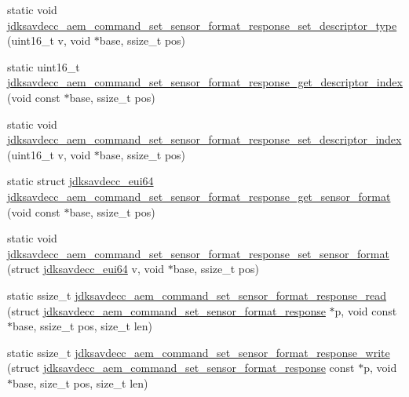 \begin{DoxyCompactItemize}
static void \hyperlink{group__command__set__sensor__format__response_gaa0feef7d1fa309ccdd3092096e2f42da}{jdksavdecc\+\_\+aem\+\_\+command\+\_\+set\+\_\+sensor\+\_\+format\+\_\+response\+\_\+set\+\_\+descriptor\+\_\+type} (uint16\+\_\+t v, void $\ast$base, ssize\+\_\+t pos)
\item 
static uint16\+\_\+t \hyperlink{group__command__set__sensor__format__response_ga404aefce22547a271cb35bf68dc91a01}{jdksavdecc\+\_\+aem\+\_\+command\+\_\+set\+\_\+sensor\+\_\+format\+\_\+response\+\_\+get\+\_\+descriptor\+\_\+index} (void const $\ast$base, ssize\+\_\+t pos)
\item 
static void \hyperlink{group__command__set__sensor__format__response_gabee4a1aaa2351e00b64bf96181ee99de}{jdksavdecc\+\_\+aem\+\_\+command\+\_\+set\+\_\+sensor\+\_\+format\+\_\+response\+\_\+set\+\_\+descriptor\+\_\+index} (uint16\+\_\+t v, void $\ast$base, ssize\+\_\+t pos)
\item 
static struct \hyperlink{structjdksavdecc__eui64}{jdksavdecc\+\_\+eui64} \hyperlink{group__command__set__sensor__format__response_gadcf1b270b1733ef7a7978c8feee30cff}{jdksavdecc\+\_\+aem\+\_\+command\+\_\+set\+\_\+sensor\+\_\+format\+\_\+response\+\_\+get\+\_\+sensor\+\_\+format} (void const $\ast$base, ssize\+\_\+t pos)
\item 
static void \hyperlink{group__command__set__sensor__format__response_ga1684e3afa658528483f2a966c5895e30}{jdksavdecc\+\_\+aem\+\_\+command\+\_\+set\+\_\+sensor\+\_\+format\+\_\+response\+\_\+set\+\_\+sensor\+\_\+format} (struct \hyperlink{structjdksavdecc__eui64}{jdksavdecc\+\_\+eui64} v, void $\ast$base, ssize\+\_\+t pos)
\item 
static ssize\+\_\+t \hyperlink{group__command__set__sensor__format__response_ga671f14942529f6fafe7dd42bac191549}{jdksavdecc\+\_\+aem\+\_\+command\+\_\+set\+\_\+sensor\+\_\+format\+\_\+response\+\_\+read} (struct \hyperlink{structjdksavdecc__aem__command__set__sensor__format__response}{jdksavdecc\+\_\+aem\+\_\+command\+\_\+set\+\_\+sensor\+\_\+format\+\_\+response} $\ast$p, void const $\ast$base, ssize\+\_\+t pos, size\+\_\+t len)
\item 
static ssize\+\_\+t \hyperlink{group__command__set__sensor__format__response_ga0cf84486a4ddbf1da655e744d96ef584}{jdksavdecc\+\_\+aem\+\_\+command\+\_\+set\+\_\+sensor\+\_\+format\+\_\+response\+\_\+write} (struct \hyperlink{structjdksavdecc__aem__command__set__sensor__format__response}{jdksavdecc\+\_\+aem\+\_\+command\+\_\+set\+\_\+sensor\+\_\+format\+\_\+response} const $\ast$p, void $\ast$base, size\+\_\+t pos, size\+\_\+t len)
\end{DoxyCompactItemize}


